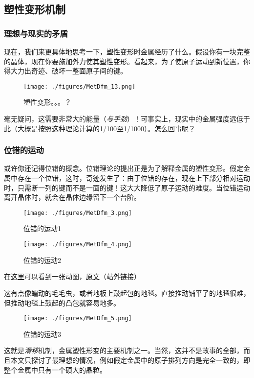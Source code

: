 \subsection{塑性变形机制}

\subsubsection{理想与现实的矛盾}
现在，我们来更具体地思考一下，塑性变形时金属经历了什么。假设你有一块完整的晶体，现在你要施加外力使其塑性变形。看起来，为了使原子运动到新位置，你得大力出奇迹、破坏一整面原子间的键。
\begin{figure}[ht]
\centering
\texttt{[image: ./figures/MetDfm\_13.png]}
\caption{塑性变形。。。？} \label{MetDfm_fig13}
\end{figure}
毫无疑问，这需要非常大的能量（\textsl{与手劲}）！可事实上，现实中的金属强度远低于此（大概是按照这种理论计算的1/100至1/1000）。怎么回事呢？

\subsubsection{位错的运动}
或许你还记得位错的概念。位错理论的提出正是为了解释金属的塑性变形。假定金属中存在一个位错，这时，奇迹发生了：由于位错的存在，现在上下部分相对运动时，只需断一列的键而不是一面的键！这大大降低了原子运动的难度。当位错运动离开晶体时，就会在晶体边缘留下一个台阶。
\begin{figure}[ht]
\centering
\texttt{[image: ./figures/MetDfm\_3.png]}
\caption{位错的运动1} \label{MetDfm_fig3}
\end{figure}

\begin{figure}[ht]
\centering
\texttt{[image: ./figures/MetDfm\_4.png]}
\caption{位错的运动2} \label{MetDfm_fig4}
\end{figure}

在\href{https://5b0988e595225.cdn.sohucs.com/q_70,c_zoom,w_640/images/20191101/b54fbd26dc14497d8607965e6b395c96.gif}{这里}可以看到一张动图，\href{https://m.sohu.com/a/350972084_120056486/}{原文}（站外链接）

这有点像蠕动的毛毛虫，或者地板上鼓起包的地毯。直接推动铺平了的地毯很难，但推动地毯上鼓起的凸包就容易地多。
\begin{figure}[ht]
\centering
\texttt{[image: ./figures/MetDfm\_5.png]}
\caption{位错的运动3} \label{MetDfm_fig5}
\end{figure}

这就是\textsl{滑移}机制，金属塑性形变的主要机制之一。当然，这并不是故事的全部，而且本文只探讨了最理想的情况，例如假定金属中的原子排列方向是完全一致的，即整个金属中只有一个硕大的晶粒。

